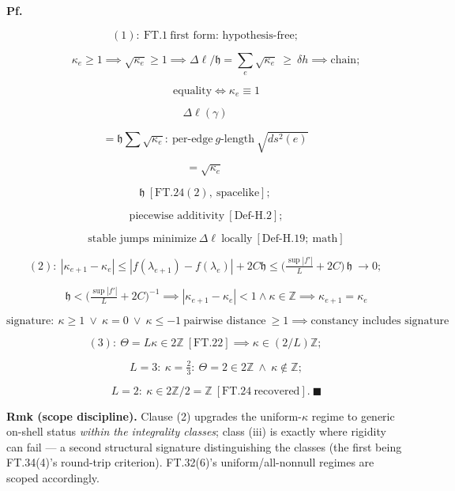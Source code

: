 \begin{theorem}
\textbf{Pf.}

\[
(1):\ \mathrm{FT.1}\ \text{first form: hypothesis-free};
\]

\[
\qquad \kappa_e\ge1\implies\sqrt{\kappa_e}\ge1\implies\Delta\ell/\mathfrak h=\sum_e\sqrt{\kappa_e}\ \ge\ \delta h\implies\text{chain};
\]

\[
\qquad \text{equality}\iff\kappa_e\equiv1
\]

\[
\Delta\ell(\gamma)
\]

\[
= \mathfrak h\textstyle\sum\sqrt{\kappa_e}:\ \text{per-edge}\ g\text{-length}\ \sqrt{ds^2(e)}
\]

\[
= \sqrt{\kappa_e}\,
\]

\[
\mathfrak h\ [\mathrm{FT.24}(2),\ \text{spacelike}];
\]

\[
\ \text{piecewise additivity}\ [\mathrm{Def\text{-}H.2}];
\]

\[
\qquad \text{stable jumps minimize}\ \Delta\ell\ \text{locally}\ [\mathrm{Def\text{-}H.19};\ \text{math}]
\]

\[
(2):\ |\kappa_{e+1}-\kappa_e|\le|f(\lambda_{e+1})-f(\lambda_e)|+2C\mathfrak h\le\bigl(\tfrac{\sup|f'|}{L}+2C\bigr)\,\mathfrak h\ \to0;
\]

\[
\qquad \mathfrak h<\bigl(\tfrac{\sup|f'|}{L}+2C\bigr)^{-1}\implies|\kappa_{e+1}-\kappa_e|<1\wedge\kappa\in\mathbb Z\implies\kappa_{e+1}=\kappa_e
\]

\[
\text{signature}:\  \kappa\ge1\ \vee\ \kappa=0\ \vee\ \kappa\le-1\ \text{pairwise distance}\ \ge1\implies\text{constancy includes signature}
\]

\[
(3):\ \Theta=L\kappa\in2\mathbb Z\ [\mathrm{FT.22}]\implies\kappa\in(2/L)\mathbb Z;
\]

\[
\qquad L=3:\ \kappa=\tfrac23:\ \Theta=2\in2\mathbb Z\ \wedge\ \kappa\notin\mathbb Z;
\]

\[
\qquad L=2:\ \kappa\in2\mathbb Z/2=\mathbb Z\ [\mathrm{FT.24}\ \text{recovered}].\ \blacksquare
\]

\textbf{Rmk (scope discipline).} Clause (2) upgrades the uniform-$\kappa$ regime to generic on-shell status \textit{within the integrality classes}; class (iii) is exactly where rigidity can fail — a second structural signature distinguishing the classes (the first being FT.34(4)'s round-trip criterion). FT.32(6)'s uniform/all-nonnull regimes are scoped accordingly.


\end{theorem}
